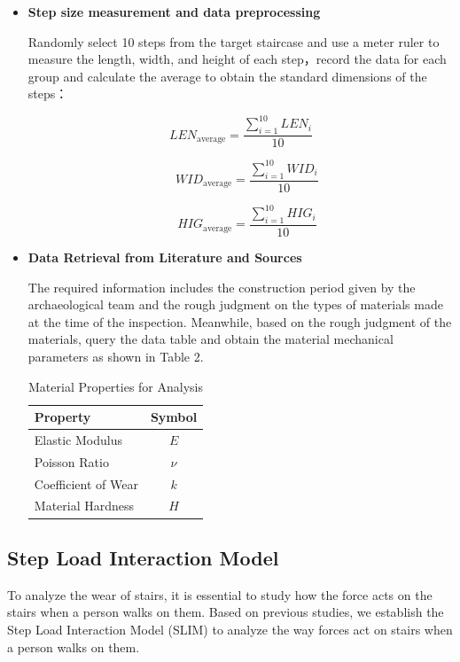 \documentclass{mcmthesis}
\begin{document}
\begin{itemize}[label=$\diamond$]
\item \textbf{Step size measurement and data preprocessing}

Randomly select 10 steps from the target staircase and use a meter ruler to measure the length, width, and height of each step，record the data for each group and calculate the average to obtain the standard dimensions of the steps：

\[LEN_{\text{average}} = \frac{\sum_{i=1}^{10} LEN_i}{10}\]

\[\quad WID_{\text{average}} = \frac{\sum_{i=1}^{10} WID_i}{10}\]

\[\quad HIG_{\text{average}} = \frac{\sum_{i=1}^{10} HIG_i}{10}\]

\item \textbf{Data Retrieval from Literature and Sources}

The required information includes the construction period given by the archaeological team and the rough judgment on the types of materials made at the time of the inspection. Meanwhile, based on the rough judgment of the materials, query the data table and obtain the material mechanical parameters as shown in Table 2.


\begin{table}[h!]
  \centering
  \caption{Material Properties for Analysis}
  \label{tab:material_properties}
  \begin{tabular}{@{} p{8cm} c @{}}
  \toprule
  \textbf{Property} & \textbf{Symbol} \\
  \midrule
  Elastic Modulus & \( E \) \\
  Poisson Ratio & \( \nu \) \\
  Coefficient of Wear & \( k \) \\
  Material Hardness & \( H \) \\
  \bottomrule
  \end{tabular}
\end{table}

\end{itemize}
  
  

\subsection{Step Load Interaction Model}
To analyze the wear of stairs, it is essential to study how the force acts on the stairs when a person walks on them. Based on previous studies, we establish the Step Load Interaction Model (SLIM) to analyze the way forces act on stairs when a person walks on them. 
 
\end{document}
